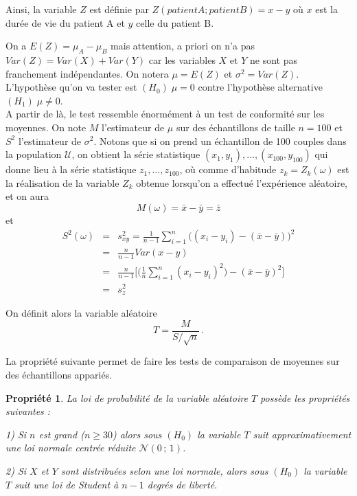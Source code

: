 \documentclass[12pt, a4paper]{book}
\newtheorem{prop}[thm]{Propriété}
\numberwithin{equation}{section}
\begin{document}
Ainsi, la variable $Z$ %
est définie par    
$Z(patient A ; patient B) = x - y$ où $x$ est la durée de vie du patient A et $y$ celle du patient B.

On a $E(Z) = \mu_A - \mu_B$ mais attention, a priori on n'a pas $Var(Z) = Var(X) + Var(Y)$ car les variables $X$ et $Y$ ne sont pas franchement indépendantes. On notera $\mu=E(Z)$ et $\sigma^2=Var(Z)$.\\

L'hypothèse qu'on va tester est $(H_0)\; \mu = 0$ contre l'hypothèse alternative $(H_1)\; \mu \neq 0$.\\

A partir de là, le test ressemble énormément à un test de conformité sur les moyennes. 
On note $M$ l'estimateur de $\mu$ sur des échantillons de taille $n=100$ et $S^2$ l'estimateur de 
$\sigma^2$. Notons que si on prend un échantillon de 100 couples dans la population $\mathcal{U}$, %
on obtient la série statistique $(x_1,y_1),\hdots,(x_{100},y_{100})$ qui donne lieu à la série statistique
$z_1,\hdots,z_{100}$,
où comme d'habitude $z_k = Z_k(\omega)$ est la réalisation de la variable $Z_k$ obtenue lorsqu'on a effectué  l'expérience aléatoire, 
et on aura
$$
M(\omega)
= \bar{x}-\bar{y} = \bar{z}
$$
et 
\begin{eqnarray*}
S^2(\omega)
 & = & s_{xy}^2  =  \frac{1}{n-1}\sum_{i=1}^n \big( (x_i-y_i) -   (\overline{x}-\overline{y}) \big)^2 \\
                & = & \frac{n}{n-1} Var(x-y)\\
                & = &   \frac{n}{n-1}\Big[ \big( \frac{1}{n} \sum_{i=1}^n (x_i-y_i)^2\big) -(\overline{x}-\overline{y})^2 \Big] \\
                & = & s^2_z
\end{eqnarray*}


On définit alors la variable aléatoire
$$
T=\frac{M}{S/\sqrt{n}}\,.
$$


La propriété suivante permet de faire les tests de comparaison de moyennes sur des échantillons appariés.

\begin{prop} 
La loi de probabilité de la variable aléatoire $T$ possède les propriétés suivantes :

1) Si $n$ est grand ($n\geq 30$) alors sous $(H_0)$ la variable $T$ suit approximativement une loi normale centrée réduite $\mathcal{N}(0\,;\,1)$.

2) Si $X$ et $Y$ sont distribuées selon une loi normale, alors sous $(H_0)$ la variable $T$ suit une loi de Student à $n-1$ degrés de liberté.
\end{prop}
\end{document}
